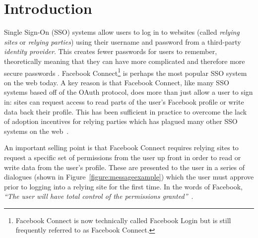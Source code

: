 \documentclass{sig-alternate}
\begin{document}

\section{Introduction}
Single Sign-On (SSO) systems allow users to log in to websites (called \textit{relying sites} or \textit{relying parties}) using their username and password from a third-party \textit{identity provider}.
This creates fewer passwords for users to remember, theoretically meaning that they can have more complicated and therefore more secure passwords \cite{openidsecurity}.
Facebook Connect\footnote{Facebook Connect is now technically called Facebook Login but is still frequently referred to as Facebook Connect.} is perhaps the most popular SSO system on the web today.
A key reason is that Facebook Connect, like many SSO systems based off of the OAuth protocol, does more than just allow a user to sign in: sites can request access to read parts of the user's Facebook profile or write data back their profile.
This has been sufficient in practice to overcome the lack of adoption incentives for relying parties which has plagued many other SSO systems on the web~\cite{sun10}.

An important selling point is that Facebook Connect requires relying sites to request a specific set of permissions from the user up front in order to read or write data from the user's profile.
These are presented to the user in a series of dialogues (shown in Figure~\ref{figure:messageexample}) which the user must approve prior to logging into a relying site for the first time.
In the words of Facebook, \textit{``The user will have total control of the permissions granted''}~\cite{fb-connect-announce}.
\end{document}
